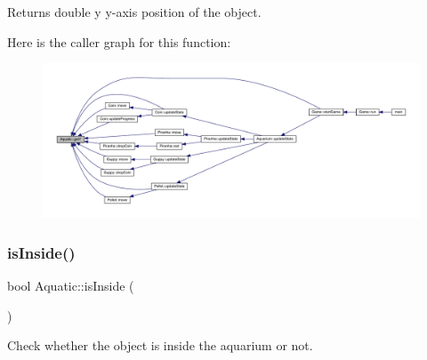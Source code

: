 \begin{DoxyReturn}{Returns}
double y y-\/axis position of the object. 
\end{DoxyReturn}
Here is the caller graph for this function\+:\nopagebreak
\begin{figure}[H]
\begin{center}
\leavevmode
\includegraphics[width=350pt]{class_aquatic_aadfede87649072d59192d923200b6fc3_icgraph}
\end{center}
\end{figure}
\mbox{\label{class_aquatic_a2c438132d8b625d3c2187ff5735193a0}} 
\subsubsection{\texorpdfstring{is\+Inside()}{isInside()}}
{\footnotesize\ttfamily bool Aquatic\+::is\+Inside (\begin{DoxyParamCaption}{ }\end{DoxyParamCaption})}



Check whether the object is inside the aquarium or not. 

